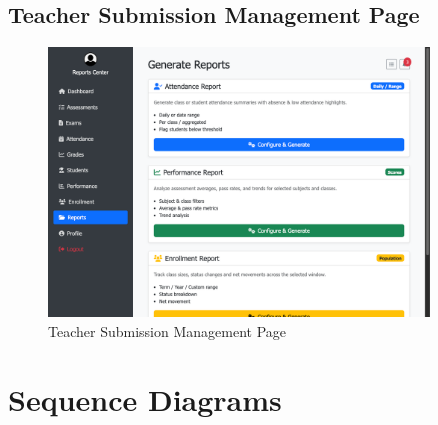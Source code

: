 \documentclass[12pt,a4paper]{report}
\begin{document}
\section{Teacher Submission Management Page}
\begin{figure}[htbp]
    \centering
    \includegraphics[width=0.9\textwidth]{teacher-reports-page.png}
    \caption{Teacher Submission Management Page}
    \label{fig:teacher-submission-management-page}
\end{figure}

\chapter{Sequence Diagrams}
\end{document}

